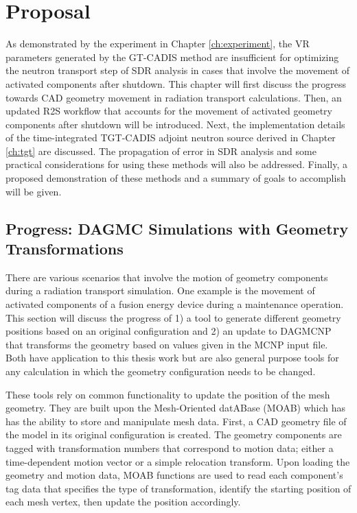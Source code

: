 
\chapter{Proposal}\label{ch:proposal}

As demonstrated by the experiment in Chapter \ref{ch:experiment},  the VR
parameters generated by the GT-CADIS method are insufficient for
optimizing the neutron transport step of SDR analysis in cases that involve the movement 
of activated components after shutdown.  
This chapter will first discuss the progress towards CAD geometry movement in 
radiation transport calculations.
Then, an updated R2S workflow that accounts for the movement of
activated geometry components after shutdown will be introduced.
Next, the implementation details of the time-integrated TGT-CADIS adjoint
neutron source derived in Chapter \ref{ch:tgt} are discussed.
The propagation of error
in SDR analysis and some practical considerations for
using these methods will also be addressed. 
Finally, a proposed demonstration of these methods and a
summary of goals to accomplish will be given.

\section{Progress: DAGMC Simulations with Geometry Transformations}\label{sec:dagmc_trans}
There are various scenarios that involve the motion of geometry components 
during a radiation transport simulation.  One example is the movement of
activated components of a fusion energy device during a maintenance operation.
This section will discuss the progress of 1) a tool to generate different 
geometry positions based on an original configuration and
2) an update to DAGMCNP that transforms the geometry based on values given in 
the MCNP input file.  Both have application to this thesis work but are also 
general purpose tools for any calculation in which the geometry configuration 
needs to be changed.

These tools rely on common functionality to update the position of the mesh
geometry.  They are built upon the Mesh-Oriented datABase (MOAB) \cite{moab} which has 
has the ability to store and manipulate mesh data.
First, a CAD geometry file of the model in its 
original configuration is created. The geometry components are tagged with 
transformation numbers that correspond to motion data; either a
time-dependent motion vector or a simple relocation transform.   
Upon loading the geometry and motion data, MOAB functions are used
to read each component's tag data that specifies the type of transformation, 
identify the starting position of each mesh vertex,  
then update the position accordingly.

